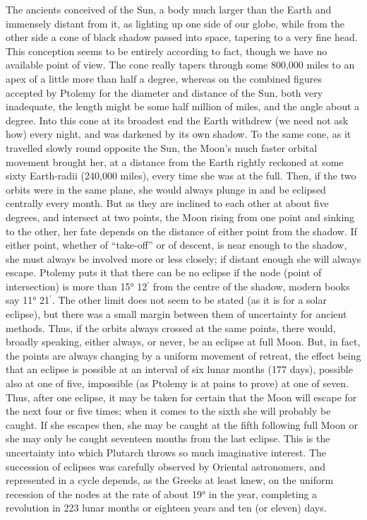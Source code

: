 \documentclass[a4paper, 11pt, oneside, polutonikogreek, english]{article}
\begin{document}
The ancients conceived of the Sun, a body much larger than the Earth and immensely distant from it, as lighting up one side of our globe, while from the other side a cone of black shadow passed into space, tapering to a very fine head. This conception seems to be entirely according to fact, though we have no available point of view. The cone really tapers through some 800,000 miles to an apex of a little more than half a degree, whereas on the combined figures accepted by Ptolemy for the diameter and distance of the Sun, both very inadequate, the length might be some half million of miles, and the angle about a degree. Into this cone at its broadest end the Earth withdrew (we need not ask how) every night, and was darkened by its own shadow. To the same cone, as it travelled slowly round opposite the Sun, the Moon's much faster orbital movement brought her, at a distance from the Earth rightly reckoned at some sixty Earth-radii (240,000 miles), every time she was at the full. Then, if the two orbits were in the same plane, she would always plunge in and be eclipsed centrally every month. But as they are inclined to each other at about five degrees, and intersect at two points, the Moon rising from one point and sinking to the other, her fate depends on the distance of either point from the shadow. If either point, whether of ``take-off'' or of descent, is near enough to the shadow, she must always be involved more or less closely; if distant enough she will always escape. Ptolemy puts it that there can be no eclipse if the node (point of intersection) is more than 15° 12$^{\prime}$ from the centre of the shadow, modern books say 11° 21$^{\prime}$. The other limit does not seem to be stated (as it is for a solar eclipse), but there was a small margin between them of uncertainty for ancient methods. Thus, if the orbits always crossed at the same points, there would, broadly speaking, either always, or never, be an eclipse at full Moon. But, in fact, the points are always changing by a uniform movement of retreat, the effect being that an eclipse is possible at an interval of six lunar months (177 days), possible also at one of five, impossible (as Ptolemy is at pains to prove) at one of seven. Thus, after one eclipse, it may be taken for certain that the Moon will escape for the next four or five times; when it comes to the sixth she will probably be caught. If she escapes then, she may be caught at the fifth following full Moon or she may only be caught seventeen months from the last eclipse. This is the uncertainty into which Plutarch throws so much imaginative interest. The succession of eclipses was carefully observed by Oriental astronomers, and represented in a cycle depends, as the Greeks at least knew, on the uniform recession of the nodes at the rate of about 19° in the year, completing a revolution in 223 lunar months or eighteen years and ten (or eleven) days.
\end{document}
